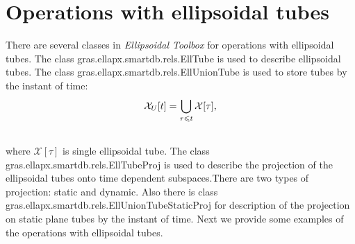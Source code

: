 \documentclass[letterpaper,10pt,english]{sphinxmanual}
\begin{document}
\section{Operations with ellipsoidal tubes}
\label{chap_implement:operations-with-ellipsoidal-tubes}
There are several classes in \emph{Ellipsoidal Toolbox} for operations with
ellipsoidal tubes. The class gras.ellapx.smartdb.rels.EllTube is used to
describe ellipsoidal tubes. The class
gras.ellapx.smartdb.rels.EllUnionTube is used to store tubes by the
instant of time:
\begin{gather}
\begin{split}{\mathcal X}_{U}[t]=\bigcup \limits_{\tau\leqslant t}{\mathcal X}[\tau],\end{split}\notag\\\begin{split}\end{split}\notag
\end{gather}
where ${\mathcal X}[\tau]$ is single ellipsoidal tube. The class
gras.ellapx.smartdb.rels.EllTubeProj is used to describe the projection
of the ellipsoidal tubes onto time dependent subspaces.There are two
types of projection: static and dynamic. Also there is class
gras.ellapx.smartdb.rels.EllUnionTubeStaticProj for description of the
projection on static plane tubes by the instant of time. Next we provide
some examples of the operations with ellipsoidal tubes.
\end{document}
